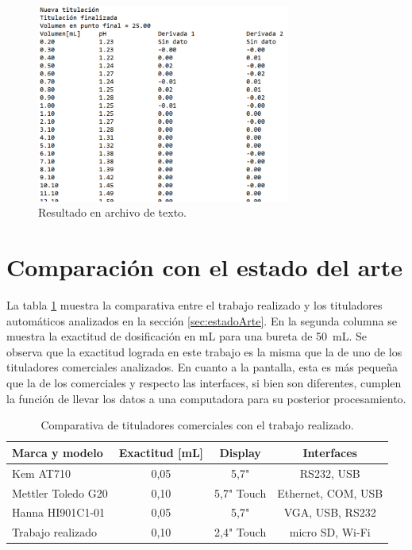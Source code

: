 \begin{figure}[htbp]
	\centering
	\includegraphics[width=0.742\textwidth]{./Figures/resultadoSD.png}
	\caption{Resultado en archivo de texto.}
	\label{fig:resultadoSD}
\end{figure}

\vspace{1,5 cm}

\section{Comparación con el estado del arte}

La tabla \ref{tab:titComparativa} muestra la comparativa entre el trabajo realizado y los tituladores automáticos analizados en la sección \ref{sec:estadoArte}. En la segunda columna se muestra la exactitud de dosificación en mL para una bureta de 50~mL. Se observa que la exactitud lograda en este trabajo es la misma que la de uno de los tituladores comerciales analizados. En cuanto a la pantalla, esta es más pequeña que la de los comerciales y respecto las interfaces, si bien son diferentes, cumplen la función de llevar los datos a una computadora para su posterior procesamiento.

\begin{table}[h]
	\centering
	\caption[Comparativa con el trabajo realizado.]{Comparativa de tituladores comerciales con el trabajo realizado.}
	\begin{tabular}{l c c c }    
		\toprule
		\textbf{Marca y modelo} & \textbf{Exactitud [mL]}	&    \textbf{Display }&\textbf{Interfaces}  \\
		\midrule
		Kem AT710 		 	& 0,05 & 5,7" 		& RS232, USB \\		
		Mettler Toledo G20	& 0,10 & 5,7" Touch	& Ethernet, COM, USB \\
		Hanna HI901C1-01	 	& 0,05 & 5,7"		& VGA, USB, RS232 \\
		Trabajo realizado 	& 0,10 & 2,4" Touch	& micro SD, Wi-Fi \\
		\bottomrule
		\hline
	\end{tabular}
	\label{tab:titComparativa}
\end{table}